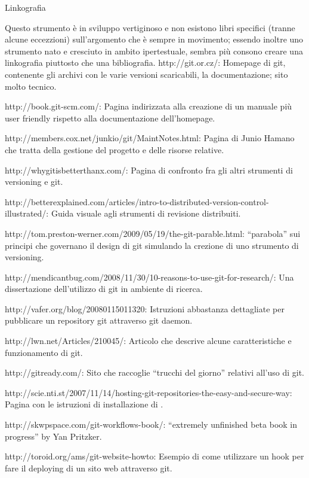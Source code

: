\capitolo Linkografia

Questo strumento \`e in sviluppo vertiginoso e non esistono libri specifici
(tranne alcune eccezzioni) sull'argomento che \`e sempre in movimento; essendo
inoltre uno strumento nato e cresciuto in ambito ipertestuale, sembra pi\`u
consono creare una linkografia piuttosto che una bibliografia.
\bigskip
\link http://git.or.cz/: Homepage di git, contenente gli archivi con le varie
versioni scaricabili, la documentazione; sito molto tecnico.

\link http://book.git-scm.com/: Pagina indirizzata alla creazione di un manuale
pi\`u user friendly rispetto alla documentazione dell'homepage.

\link http://members.cox.net/junkio/git/MaintNotes.html: Pagina di Junio Hamano che tratta della gestione del progetto e delle risorse relative.

\link http://whygitisbetterthanx.com/: Pagina di confronto fra gli altri
strumenti di versioning e git.

\link
http://betterexplained.com/articles/intro-to-distributed-version-control-illustrated/:
Guida visuale agli strumenti di revisione distribuiti.

\link http://tom.preston-werner.com/2009/05/19/the-git-parable.html:
``parabola'' sui principi che governano il design di git simulando la crezione di uno
strumento di versioning.

\link http://mendicantbug.com/2008/11/30/10-reasons-to-use-git-for-research/:
Una dissertazione dell'utilizzo di git in ambiente di ricerca.

\link http://vafer.org/blog/20080115011320:
Istruzioni abbastanza dettagliate per pubblicare un repository git attraverso
git daemon.

\link http://lwn.net/Articles/210045/: Articolo che descrive alcune
caratteristiche e funzionamento di git.

\link http://gitready.com/: Sito che raccoglie ``trucchi del giorno''
relativi all'uso di git.

\link
http://scie.nti.st/2007/11/14/hosting-git-repositories-the-easy-and-secure-way: Pagina con le istruzioni di installazione di .

\link http://skwpspace.com/git-workflows-book/: ``extremely unfinished beta book
in progress'' by Yan Pritzker.

\link http://toroid.org/ams/git-website-howto: Esempio di come utilizzare un
hook per fare il deploying di un sito web attraverso git.

\vfill\eject
